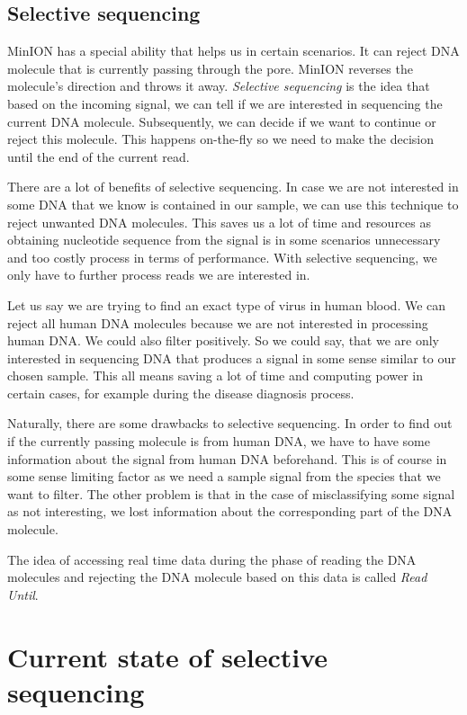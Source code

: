 \subsection{Selective sequencing}

MinION has a special ability that helps us in certain scenarios. It can reject
DNA molecule that is currently passing through the pore. MinION reverses the molecule’s direction and throws it away.
\textit{Selective sequencing} is the idea that based on the incoming signal, we can tell
if we are interested in sequencing the current DNA molecule. Subsequently, we can decide if we want
to continue or reject this molecule. This happens on-the-fly so we need to make
the decision until the end of the current read.

There are a lot of benefits of selective sequencing. In case we are not interested
in some DNA that we know is contained in our sample, we can use this technique to
reject unwanted DNA molecules. This saves us a lot of time and resources as obtaining
nucleotide sequence from the signal is in some scenarios unnecessary and too
costly process in terms of performance. With selective sequencing, we only have
to further process reads we are interested in.

Let us say we are trying to find an exact type of virus in human blood. We can
reject all human DNA molecules because we are not interested in processing human
DNA. We could also filter positively. So we could say, that we are only
interested in sequencing DNA that produces a signal in some sense similar to our
chosen sample. This all means saving a lot of time and computing power in certain
cases, for example during the disease diagnosis process.

Naturally, there are some drawbacks to selective sequencing. In order to find out
if the currently passing molecule is from human DNA, we have to have some information
about the signal from human DNA beforehand.
This is of course in some sense limiting factor as we need a sample signal from
the species that we want to filter. The other problem is that in the case of misclassifying
some signal as not interesting, we lost information about the corresponding
part of the DNA molecule.

The idea of accessing real time data during the phase of reading the DNA molecules
and rejecting the DNA molecule based on this data is called \textit{Read Until}. 

\section{Current state of selective sequencing}

